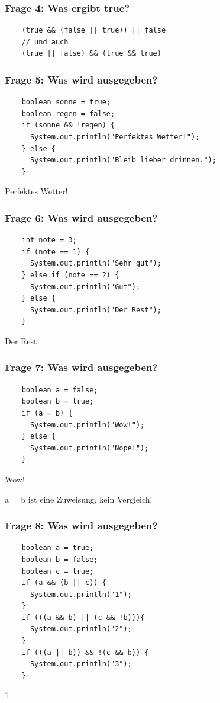\documentclass{../../presentation}
\begin{document}
\begin{frame}[fragile]
	\frametitle{Frage 4: Was ergibt true?}
	\pause
	\begin{verbatim}
    (true && (false || true)) || false
    // und auch
    (true || false) && (true && true)
  \end{verbatim}
\end{frame}

\begin{frame}[fragile]
	\frametitle{Frage 5: Was wird ausgegeben?}
	\begin{verbatim}
    boolean sonne = true;
    boolean regen = false;
    if (sonne && !regen) {
      System.out.println("Perfektes Wetter!");
    } else {
      System.out.println("Bleib lieber drinnen.");
    }
  \end{verbatim}
	\pause
	\begin{ausgabe}
		Perfektes Wetter!
	\end{ausgabe}
\end{frame}

\begin{frame}[fragile]
	\frametitle{Frage 6: Was wird ausgegeben?}
	\begin{verbatim}
    int note = 3;
    if (note == 1) {
      System.out.println("Sehr gut");
    } else if (note == 2) {
      System.out.println("Gut");
    } else {
      System.out.println("Der Rest");
    }
  \end{verbatim}
	\pause
	\begin{ausgabe}
		Der Rest
	\end{ausgabe}
\end{frame}

\begin{frame}[fragile]
	\frametitle{Frage 7: Was wird ausgegeben?}
	\begin{verbatim}
    boolean a = false;
    boolean b = true;
    if (a = b) {
      System.out.println("Wow!");
    } else {
      System.out.println("Nope!");
    }
  \end{verbatim}
	\pause
	\begin{ausgabe}
		Wow!
	\end{ausgabe}
	a = b ist eine Zuweisung, kein Vergleich!\\
\end{frame}

\begin{frame}[fragile]
	\frametitle{Frage 8: Was wird ausgegeben?}
	\begin{verbatim}
    boolean a = true;
    boolean b = false;
    boolean c = true;
    if (a && (b || c)) {
      System.out.println("1");
    }
    if (((a && b) || (c && !b))){
      System.out.println("2");
    }
    if (((a || b)) && !(c && b)) {
      System.out.println("3");
    }
  \end{verbatim}
	\pause
	\begin{ausgabe}
		1
	\end{ausgabe}
\end{frame}
\end{document}
